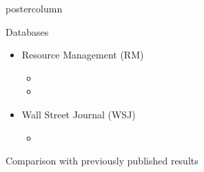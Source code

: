 \documentclass[final,hyperref={pdfpagelabels=false}]{beamer}
\begin{document}
\begin{frame}[fragile]
\begin{columns}
\begin{column}{.33\textwidth}
\begin{beamercolorbox}[center,wd=\textwidth]{postercolumn}
\begin{minipage}[T]{.95\textwidth}
{            \begin{block}{Databases}
              \begin{itemize}
              \item Resource Management (RM)
                \begin{itemize}
                \item 
                \item 
                \end{itemize}
              \item Wall Street Journal (WSJ)
                \begin{itemize}
                \item
                \end{itemize}
              \end{itemize}
            \end{block}
            \vfill
            \begin{block}{Comparison with previously published results}
              \begin{columns}
                \begin{column}{.5\textwidth}
                  \begin{table}
                    \small
                    \centering
                    \begin{tabular}{@{} l @{} c c@{}}

\end{tabular}
\end{table}
\end{column}
\end{columns}
\end{block}}
\end{minipage}
\end{beamercolorbox}
\end{column}
\end{columns}
\end{frame}
\end{document}
